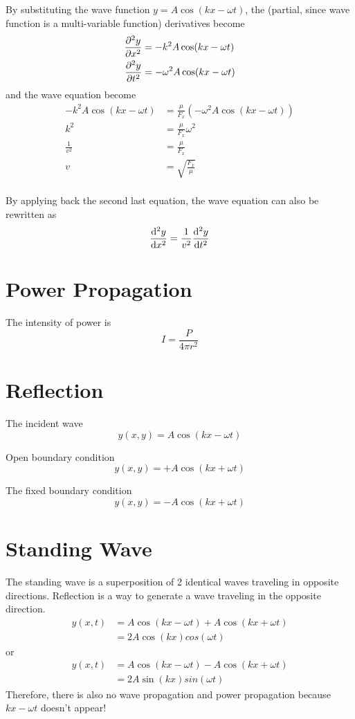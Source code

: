 \documentclass{note}
\begin{document}
By substituting the wave function \(y = A \cos(k x - \omega t)\), the (partial, since wave function is a multi-variable function) derivatives become
\begin{align*}
  \pdv[2]{y}{x} & = -k^2 A \cos(k x - \omega t) \\
  \pdv[2]{y}{t} & = -\omega^2 A \cos(k x - \omega t)
\end{align*}
and the wave equation become
\begin{align*}
      -k^2 A \cos(k x - \omega t) & = \frac{\mu}{F_x} (-\omega^2 A \cos(k x - \omega t)) \\
      k^2 & = \frac{\mu}{F_x} \omega^2 \\
      \frac{1}{v^2} & = \frac{\mu}{F_x} \\
      v & = \sqrt{\frac{F_x}{\mu}} \\
\end{align*}

By applying back the second last equation, the wave equation can also be rewritten as
\[
\dv[2]{y}{x} = \frac{1}{v^2} \dv[2]{y}{t}
\]

\section{Power Propagation}

The intensity of power is
\[
  I = \frac{P}{4 \pi r^2}
\]

\section{Reflection}

The incident wave
\[
  y(x, y) = A\cos(kx-\omega t)
\]

Open boundary condition
\[
  y(x, y) = +A\cos(kx+\omega t)
\]

The fixed boundary condition
\[
  y(x, y) = -A\cos(kx+\omega t)
\]

\section{Standing Wave}

The standing wave is a superposition of 2 identical waves traveling in opposite directions.
Reflection is a way to generate a wave traveling in the opposite direction.
\begin{align*}
  y(x, t)
    & = A\cos(kx-\omega t) + A\cos(kx+\omega t) \\
    & = 2A\cos(kx)cos(\omega t)
\end{align*}
or
\begin{align*}
  y(x, t)
    & = A\cos(kx-\omega t) - A\cos(kx+\omega t) \\
    & = 2A\sin(kx)sin(\omega t)
\end{align*}
Therefore, there is also no wave propagation and power propagation because \(kx-\omega t\) doesn't appear!
\end{document}
